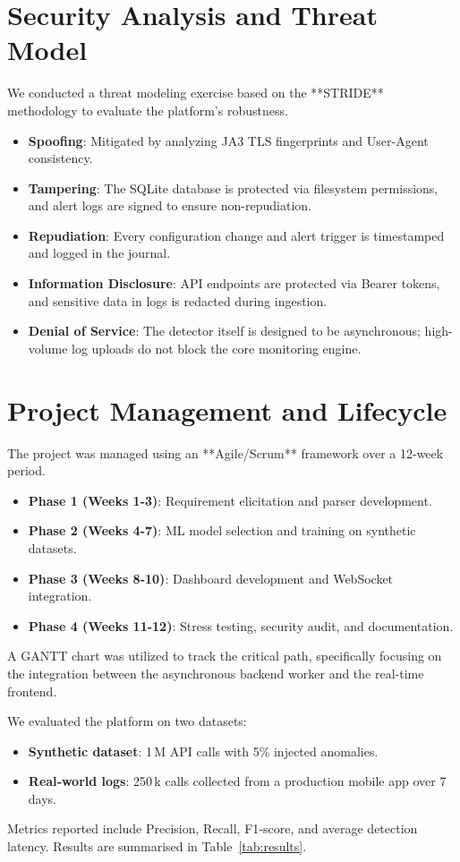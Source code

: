 \documentclass[preprint,12pt,a4paper]{elsarticle}
\begin{document}
\section{Security Analysis and Threat Model}
We conducted a threat modeling exercise based on the **STRIDE** methodology to evaluate the platform's robustness.

\begin{itemize}
    \item \textbf{Spoofing}: Mitigated by analyzing JA3 TLS fingerprints and User-Agent consistency.
    \item \textbf{Tampering}: The SQLite database is protected via filesystem permissions, and alert logs are signed to ensure non-repudiation.
    \item \textbf{Repudiation}: Every configuration change and alert trigger is timestamped and logged in the journal.
    \item \textbf{Information Disclosure}: API endpoints are protected via Bearer tokens, and sensitive data in logs is redacted during ingestion.
    \item \textbf{Denial of Service}: The detector itself is designed to be asynchronous; high-volume log uploads do not block the core monitoring engine.
\end{itemize}

\section{Project Management and Lifecycle}
The project was managed using an **Agile/Scrum** framework over a 12-week period. 
\begin{itemize}
    \item \textbf{Phase 1 (Weeks 1-3)}: Requirement elicitation and parser development.
    \item \textbf{Phase 2 (Weeks 4-7)}: ML model selection and training on synthetic datasets.
    \item \textbf{Phase 3 (Weeks 8-10)}: Dashboard development and WebSocket integration.
    \item \textbf{Phase 4 (Weeks 11-12)}: Stress testing, security audit, and documentation.
\end{itemize}
A GANTT chart was utilized to track the critical path, specifically focusing on the integration between the asynchronous backend worker and the real-time frontend.

We evaluated the platform on two datasets:
\begin{itemize}
  \item \textbf{Synthetic dataset}: 1\,M API calls with 5\% injected anomalies.
  \item \textbf{Real‑world logs}: 250\,k calls collected from a production mobile app over 7\,days.
\end{itemize}
Metrics reported include Precision, Recall, F1‑score, and average detection latency. Results are summarised in Table~\ref{tab:results}.
\end{document}
